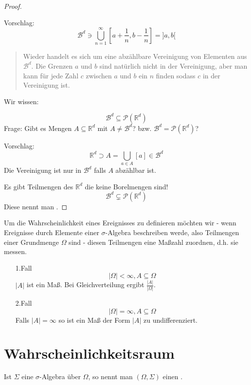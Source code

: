 \begin{proof}
\begin{itemize}
Vorschlag:
$$ \mathcal B^d \ni \bigcup_{n=1}^\infty [a+\frac{1}{n},b-\frac{1}{n}] = ]a,b[ $$
\begin{quote}
 Wieder handelt es sich um eine abzählbare Vereinigung von Elementen aus $\mathcal B^d$. Die Grenzen $a$ und $b$ sind natürlich nicht in der Vereinigung, aber man kann für jede Zahl $c$ zwischen $a$ und $b$ ein $n$ finden sodass $c$ in der Vereinigung ist.
\end{quote}
\end{itemize}

Wir wissen:

$$ \mathcal B ^d \subseteq \mathcal P (\mathbb R^d) $$
Frage:
Gibt es Mengen $A \subseteq \mathbb R^d$ mit $A \neq \mathcal B^d$? bzw. $ \mathcal B ^d = \mathcal P (\mathbb R^d) $?

Vorschlag:
$$ \mathbb R^d \supset A = \bigcup_{a\in A} [a] \in \mathcal B^d $$
Die Vereinigung ist nur in $\mathcal B^d$ falls $A$ abzählbar ist.

Es gibt Teilmengen des $\mathbb R^d$ die keine Borelmengen sind!
$$ \mathcal B ^d \subsetneq \mathcal P (\mathbb R^d) $$
Diese nennt man .
\end{proof}


Um die Wahrscheinlichkeit eines Ereignisses zu definieren möchten wir - wenn Ereignisse durch Elemente einer $\sigma$-Algebra beschreiben werde, also Teilmengen einer Grundmenge $\Omega$ sind - diesen Teilmengen eine Maßzahl zuordnen, d.h. sie messen.
\begin{itemize}
 \item[1.Fall]
$$ \lvert \Omega \rvert < \infty, A \subseteq \Omega$$
$\lvert A \rvert$ ist ein Maß. Bei Gleichverteilung ergibt $\frac{\lvert A \rvert}{\lvert \Omega \rvert}$.
 \item[2.Fall]
$$ \lvert \Omega \rvert = \infty, A \subseteq \Omega$$
Falls $\lvert A \rvert = \infty$ so ist ein Maß der Form $\lvert A \rvert$ zu undifferenziert.
\end{itemize}
\section{Wahrscheinlichkeitsraum}
Ist $\Sigma$ eine $\sigma$-Algebra über $\Omega$, so nennt man $(\Omega,\Sigma)$ einen .

